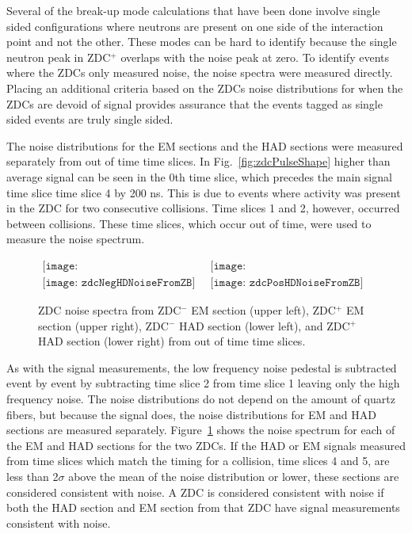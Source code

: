       Several of the break-up mode calculations that have been done involve
        single sided configurations where neutrons are present on one side
        of the interaction point and not the other.
      These modes can be hard to identify because the single neutron peak in 
        ZDC$^{+}$ overlaps with the noise peak at zero.
      To identify events where the ZDCs only measured noise, the noise
        spectra were measured directly.
      Placing an additional criteria based on the ZDCs noise distributions for
        when the ZDCs are devoid of signal provides assurance that the events 
        tagged as single sided events are truly single sided.

      
      The noise distributions for the EM sections and the HAD sections were
        measured separately from out of time time slices.
      In Fig.~\ref{fig:zdcPulseShape} higher than average signal can be seen
        in the 0th time slice, which precedes the main signal time slice 
        time slice 4 by 200 ns. 
      This is due to events where activity was present in the ZDC for 
        two consecutive collisions.
      Time slices 1 and 2, however, occurred between collisions.
      These time slices, which occur out of time, were used to measure the 
        noise spectrum.
      \begin{figure}[!Hhbt]
        \centering
        $ \begin{array}{cc}
          \texttt{[image: zdcNegEMNoiseFromZBNoCor]} & 
          \texttt{[image: zdcPosEMNoiseFromZBNoCor]} \\
          \texttt{[image: zdcNegHDNoiseFromZB]} &
          \texttt{[image: zdcPosHDNoiseFromZB]}
        \end{array} $
        \caption{ZDC noise spectra from ZDC$^{-}$ EM section (upper left), 
          ZDC$^{+}$ EM section (upper right), ZDC$^{-}$ HAD section (lower left), 
          and ZDC$^{+}$ HAD section (lower right) from out of time time slices.}
        \label{fig:zdcNoiseSpectra}
      \end{figure}

      As with the signal measurements, the low frequency noise pedestal is 
        subtracted event by event by subtracting time slice 2 from time slice
        1 leaving only the high frequency noise.
      The noise distributions do not depend on the amount of quartz fibers, but
        because the signal does, the noise distributions for EM and HAD sections
        are measured separately.
      Figure~\ref{fig:zdcNoiseSpectra} shows the noise spectrum for each of the 
        EM and HAD sections for the two ZDCs.
      If the HAD or EM signals measured from time slices which match the 
        timing for a collision, time slices 4 and 5, are less than 2$\sigma$ 
        above the mean of the noise distribution or lower, these sections are 
        considered consistent with noise.
      A ZDC is considered consistent with noise if both the HAD section and EM 
        section from that ZDC have signal measurements consistent with noise.

